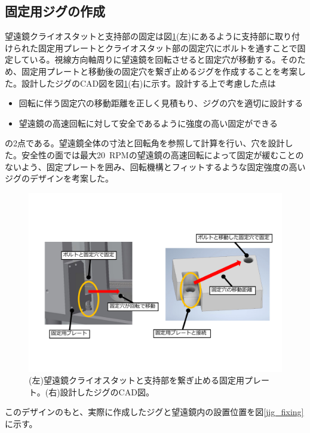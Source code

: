 \subsection{固定用ジグの作成}
望遠鏡クライオスタットと支持部の固定は図\ref{fixing_jig_design}(左)にあるように支持部に取り付けられた固定用プレートとクライオスタット部の固定穴にボルトを通すことで固定している。視線方向軸周りに望遠鏡を回転させると固定穴が移動する。そのため、固定用プレートと移動後の固定穴を繋ぎ止めるジグを作成することを考案した。設計したジグのCAD図を図\ref{fixing_jig_design}(右)に示す。設計する上で考慮した点は
\begin{itemize}
  \item 回転に伴う固定穴の移動距離を正しく見積もり、ジグの穴を適切に設計する
  \item 望遠鏡の高速回転に対して安全であるように強度の高い固定ができる
\end{itemize}
の2点である。望遠鏡全体の寸法と回転角を参照して計算を行い、穴を設計した。安全性の面では最大\SI{20}{RPM}の望遠鏡の高速回転によって固定が緩むことのないよう、固定プレートを囲み、回転機構とフィットするような固定強度の高いジグのデザインを考案した。
\begin{figure}[htbp]
  \centering
  \includegraphics[width=0.95\columnwidth]{5_alignment/figs/fixing_jig_design.pdf}
  \caption{(左)望遠鏡クライオスタットと支持部を繋ぎ止める固定用プレート。(右)設計したジグのCAD図。}
  \label{fixing_jig_design}
\end{figure}
このデザインのもと、実際に作成したジグと望遠鏡内の設置位置を図\ref{jig_fixing}に示す。
